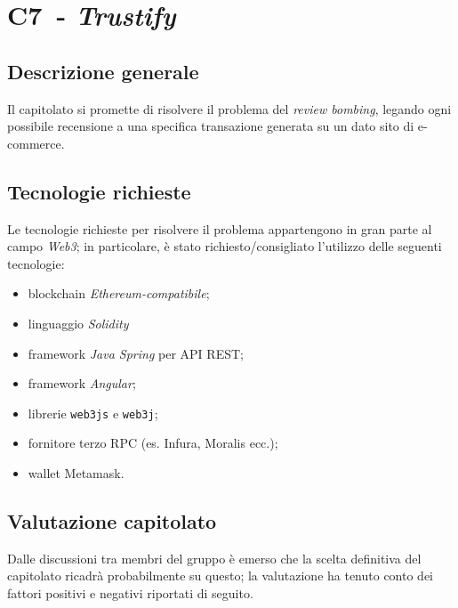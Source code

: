 
\renewcommand{\capName}{\textit{Trustify}} %
\renewcommand{\capCode}{C7} %
\renewcommand{\capLink}{https://www.math.unipd.it/~tullio/IS-1/2022/Progetto/C7.pdf} %
\renewcommand{\capProposer}{SyncLab} %


\section{\capCode\ - \capName}
\subsection{Descrizione generale}
Il capitolato si promette di risolvere il problema del \textit{review bombing}, legando ogni possibile recensione a una specifica transazione generata su un dato sito di e-commerce.
\subsection{Tecnologie richieste}
Le tecnologie richieste per risolvere il problema appartengono in gran parte al campo \textit{Web3}; in particolare, è stato richiesto/consigliato l'utilizzo delle seguenti tecnologie:
\begin{itemize}
    \item blockchain \textit{Ethereum-compatibile};
    \item linguaggio \textit{Solidity}
    \item framework \textit{Java Spring} per API REST;
    \item framework \textit{Angular};
    \item librerie \texttt{web3js} e \texttt{web3j};
    \item fornitore terzo RPC (es. Infura, Moralis ecc.);
    \item wallet Metamask.
\end{itemize}
\subsection{Valutazione capitolato}
Dalle discussioni tra membri del gruppo è emerso che la scelta definitiva del capitolato ricadrà probabilmente su questo; la valutazione ha tenuto conto dei fattori positivi e negativi riportati di seguito.

